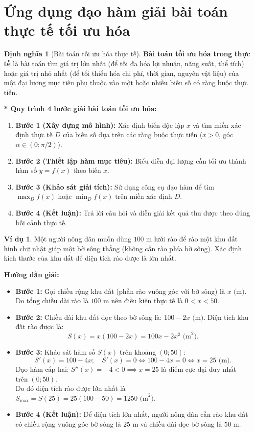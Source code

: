 \documentclass[12pt,a4paper]{article}
\theoremstyle{definition}
\newtheorem{dn}{Định nghĩa}[section]
\newtheorem{vd}{Ví dụ}[section]
\begin{document}
\vspace{5mm}
\section{Ứng dụng đạo hàm giải bài toán thực tế tối ưu hóa}

\begin{dn}[Bài toán tối ưu hóa thực tế]
\textbf{Bài toán tối ưu hóa trong thực tế} là bài toán tìm giá trị lớn nhất (để tối đa hóa lợi nhuận, năng suất, thể tích) hoặc giá trị nhỏ nhất (để tối thiểu hóa chi phí, thời gian, nguyên vật liệu) của một đại lượng mục tiêu phụ thuộc vào một hoặc nhiều biến số có ràng buộc thực tiễn.
\end{dn}

\noindent \textbf{* Quy trình 4 bước giải bài toán tối ưu hóa:}
\begin{enumerate}
    \item \textbf{Bước 1 (Xây dựng mô hình):} Xác định biến độc lập $x$ và tìm miền xác định thực tế $D$ của biến số dựa trên các ràng buộc thực tiễn ($x > 0$, góc $\alpha \in (0; \pi/2)$).
    \item \textbf{Bước 2 (Thiết lập hàm mục tiêu):} Biểu diễn đại lượng cần tối ưu thành hàm số $y = f(x)$ theo biến $x$.
    \item \textbf{Bước 3 (Khảo sát giải tích):} Sử dụng công cụ đạo hàm để tìm $\max_D f(x)$ hoặc $\min_D f(x)$ trên miền xác định $D$.
    \item \textbf{Bước 4 (Kết luận):} Trả lời câu hỏi và diễn giải kết quả thu được theo đúng bối cảnh thực tế.
\end{enumerate}

\begin{vd}
Một người nông dân muốn dùng $100\text{ m}$ lưới rào để rào một khu đất hình chữ nhật giáp một bờ sông thẳng (không cần rào phía bờ sông). Xác định kích thước của khu đất để diện tích rào được là lớn nhất.
\end{vd}
\noindent \textbf{Hướng dẫn giải:}
\begin{itemize}
    \item \textbf{Bước 1:} Gọi chiều rộng khu đất (phần rào vuông góc với bờ sông) là $x\text{ (m)}$. Do tổng chiều dài rào là $100\text{ m}$ nên điều kiện thực tế là $0 < x < 50$.
    \item \textbf{Bước 2:} Chiều dài khu đất dọc theo bờ sông là: $100 - 2x\text{ (m)}$. Diện tích khu đất rào được là:
    \[
    S(x) = x(100 - 2x) = 100x - 2x^2\text{ (m}^2\text{)}.
    \]
    \item \textbf{Bước 3:} Khảo sát hàm số $S(x)$ trên khoảng $(0; 50)$:
    \[
    S'(x) = 100 - 4x; \quad S'(x) = 0 \iff 100 - 4x = 0 \iff x = 25\text{ (m)}.
    \]
    Đạo hàm cấp hai: $S''(x) = -4 < 0 \implies x = 25$ là điểm cực đại duy nhất trên $(0; 50)$. \\
    Do đó diện tích rào được lớn nhất là $S_{\max} = S(25) = 25(100 - 50) = 1250\text{ (m}^2\text{)}$.
    \item \textbf{Bước 4 (Kết luận):} Để diện tích lớn nhất, người nông dân cần rào khu đất có chiều rộng vuông góc bờ sông là $25\text{ m}$ và chiều dài dọc bờ sông là $50\text{ m}$.
\end{itemize}
\end{document}
